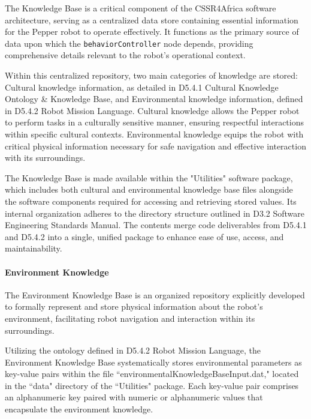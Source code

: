 \documentclass{CSSRforAfrica}
\begin{document}
The Knowledge Base is a critical component of the CSSR4Africa software architecture, serving as a centralized data store containing essential information for the Pepper robot to operate effectively. It functions as the primary source of data upon which the \texttt{\small behaviorController} node depends, providing comprehensive details relevant to the robot's operational context.

Within this centralized repository, two main categories of knowledge are stored: \textnormal{Cultural knowledge information}, as detailed in \textnormal{D5.4.1 Cultural Knowledge Ontology \& Knowledge Base}, and \textnormal{Environmental knowledge information}, defined in \textnormal{D5.4.2 Robot Mission Language}. Cultural knowledge allows the Pepper robot to perform tasks in a culturally sensitive manner, ensuring respectful interactions within specific cultural contexts. Environmental knowledge equips the robot with critical physical information necessary for safe navigation and effective interaction with its surroundings.

The Knowledge Base is made available within the "Utilities" software package, which includes both cultural and environmental knowledge base files alongside the software components required for accessing and retrieving stored values. Its internal organization adheres to the directory structure outlined in \textnormal{D3.2 Software Engineering Standards Manual}. The contents merge code deliverables from \textnormal{D5.4.1} and \textnormal{D5.4.2} into a single, unified package to enhance ease of use, access, and maintainability.




\paragraph{Environment Knowledge}\mbox{}%

The Environment Knowledge Base is an organized repository explicitly developed to formally represent and store physical information about the robot's environment, facilitating robot navigation and interaction within its surroundings.

Utilizing the ontology defined in \textnormal{D5.4.2 Robot Mission Language}, the Environment Knowledge Base systematically stores environmental parameters as key-value pairs within the file ``environmentalKnowledgeBaseInput.dat," located in the ``data" directory of the ``Utilities" package. Each key-value pair comprises an alphanumeric key paired with numeric or alphanumeric values that encapsulate the environment knowledge.
\end{document}
